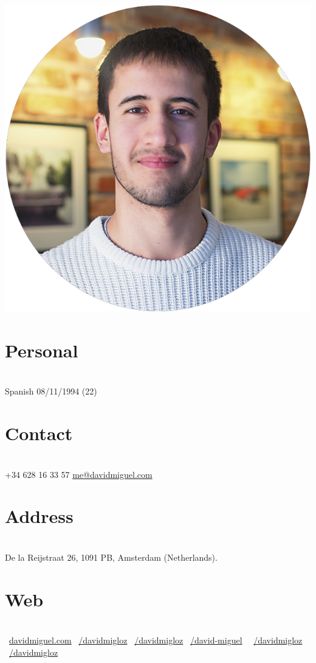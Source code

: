 \documentclass[]{friggeri-cv}
\begin{document}
      

\begin{aside}
  \includegraphics[scale=0.18]{img/profile.png}
  \section{Personal}
    \\[0.3cm] 
    Spanish
    08/11/1994 (22)
    ~  
  \section{Contact}
    \\[0.3cm]  
    +34 628 16 33 57
    \href{mailto:me@davidmiguel.com}{me@davidmiguel.com}
    ~  
  \section{Address}
    \\[0.3cm]  
    De la Reijstraat 26,
    1091 PB, Amsterdam
    (Netherlands).
    ~    
  \section{Web}
    \\[0.3cm]
    \faGlobe\ \href{http://davidmiguel.com}{davidmiguel.com}
    \faLinkedin\ \href{https://www.linkedin.com/in/davidmigloz}{/davidmigloz}
    \faGithub\ \href{https://github.com/davidmigloz/}{/davidmigloz}
    \faStackOverflow\ \href{http://stackoverflow.com/users/6305235/david-miguel}{/david-miguel}    
    \faFacebook\ \ \href{https://www.facebook.com/DavidMigLoz}{/davidmigloz}
    \faTwitter\ \href{https://twitter.com/DavidMigLoz}{/davidmigloz}
    ~

\end{aside}
\end{document}
